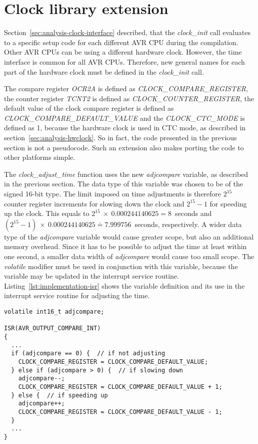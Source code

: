 
\section{Clock library extension}\label{sec:implementation-clock}
Section~\ref{sec:analysis-clock-interface} described, that
the {\it{clock\_init}} call evaluates to a specific setup code
for each different AVR CPU during the compilation.
Other AVR CPUs can be using a different hardware clock.
However, the time interface is common for all AVR CPUs.
Therefore, new general names for each part of the hardware clock
must be defined in the {\it{clock\_init}} call.

The compare register {\it{OCR2A}} is defined as {\it{CLOCK\_COMPARE\_REGISTER}},
the counter register {\it{TCNT2}} is defined as {\it{CLOCK\_COUNTER\_REGISTER}},
the default value of the clock compare register is defined as {\it{CLOCK\_COMPARE\_DEFAULT\_VALUE}}
and the {\it{CLOCK\_CTC\_MODE}} is defined as 1, because the hardware clock is used in CTC mode,
as described in section~\ref{sec:analysis-hwclock}.
So in fact, the code presented in the previous section is not a pseudocode.
Such an extension also makes porting the code to other platforms simple.

The {\it{clock\_adjust\_time}} function uses the new {\it{adjcompare}} variable,
as described in the previous section.
The data type of this variable was chosen to be of the signed 16-bit type.
The limit imposed on time adjustments is therefore $2^{15}$ counter register increments
for slowing down the clock and $2^{15}-1$ for speeding up the clock.
This equals to $2^{15}~\times~0.000244140625 = 8$~seconds
and $(2^{15} - 1)~\times~0.000244140625 \doteq 7.999756$~seconds, respectively.
A wider data type of the {\it{adjcompare}} variable would cause greater scope,
but also an additional memory overhead.
Since it has to be possible to adjust the time at least within one second,
a smaller data width of {\it{adjcompare}} would cause too small scope.
The {\it{volatile}} modifier must be used in conjunction with this variable,
because the variable may be updated in the interrupt service routine.
Listing~\ref{lst:implementation-isr} shows the variable definition
and its use in the interrupt service routine for adjusting the time.
\begin{lstlisting}[caption={Pseudocode of adjustments in interrupt service routine},label={lst:implementation-isr}]
volatile int16_t adjcompare;

ISR(AVR_OUTPUT_COMPARE_INT)
{
  ...
  if (adjcompare == 0) {  // if not adjusting
    CLOCK_COMPARE_REGISTER = CLOCK_COMPARE_DEFAULT_VALUE;
  } else if (adjcompare > 0) {  // if slowing down
    adjcompare--;
    CLOCK_COMPARE_REGISTER = CLOCK_COMPARE_DEFAULT_VALUE + 1;
  } else {  // if speeding up
    adjcompare++;
    CLOCK_COMPARE_REGISTER = CLOCK_COMPARE_DEFAULT_VALUE - 1;
  }
  ...
}
\end{lstlisting}
